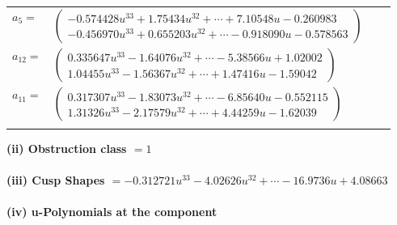 \documentclass[1p]{elsarticle_modified}
\theoremstyle{definition}
\begin{document}
\begin{tabular}{m{7pt} m{180pt} m{7pt} m{180pt} }
\flushright $a_{5}=$&$\begin{pmatrix}-0.574428 u^{33}+1.75434 u^{32}+\cdots+7.10548 u-0.260983\\-0.456970 u^{33}+0.655203 u^{32}+\cdots-0.918090 u-0.578563\end{pmatrix}$ \\
\flushright $a_{12}=$&$\begin{pmatrix}0.335647 u^{33}-1.64076 u^{32}+\cdots-5.38566 u+1.02002\\1.04455 u^{33}-1.56367 u^{32}+\cdots+1.47416 u-1.59042\end{pmatrix}$ \\
\flushright $a_{11}=$&$\begin{pmatrix}0.317307 u^{33}-1.83073 u^{32}+\cdots-6.85640 u-0.552115\\1.31326 u^{33}-2.17579 u^{32}+\cdots+4.44259 u-1.62039\end{pmatrix}$\\&\end{tabular}
\flushleft \textbf{(ii) Obstruction class $= 1$}\\~\\
\flushleft \textbf{(iii) Cusp Shapes $= -0.312721 u^{33}-4.02626 u^{32}+\cdots-16.9736 u+4.08663$}\\~\\
\newpage\renewcommand{\arraystretch}{1}
\flushleft \textbf{(iv) u-Polynomials at the component}\newline \\
\end{document}
